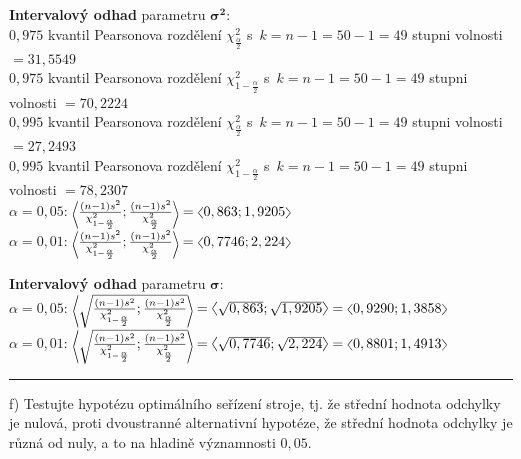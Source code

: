 \documentclass[a4paper, 11pt]{article}
\newcommand{\intlr}[1]{\scaleleftright[1ex]{<}{#1}{>}}
\begin{document}
	\vspace{1em}
	\textbf{Intervalový odhad} parametru $ \boldsymbol{\sigma^2} $: \\
	$ 0,975 $ kvantil Pearsonova rozdělení $ \chi_{\frac{\alpha}{2}}^2 $
	s~$ k = n - 1 = 50 - 1 = 49 $ stupni volnosti $ = 31,5549 $ \\
	$ 0,975 $ kvantil Pearsonova rozdělení $ \chi_{1 - \frac{\alpha}{2}}^2 $
	s~$ k = n - 1 = 50 - 1 = 49 $ stupni volnosti $ = 70,2224 $ \\
	$ 0,995 $ kvantil Pearsonova rozdělení $ \chi_{\frac{\alpha}{2}}^2 $
	s~$ k = n - 1 = 50 - 1 = 49 $ stupni volnosti $ = 27,2493 $ \\
	$ 0,995 $ kvantil Pearsonova rozdělení $ \chi_{1 - \frac{\alpha}{2}}^2 $
	s~$ k = n - 1 = 50 - 1 = 49 $ stupni volnosti $ = 78,2307 $ \\
	$ \alpha = 0,05 $: $ \intlr{\frac{(n - 1) s^2}{\chi_{1 -
	\frac{\alpha}{2}}^2}; \frac{(n - 1) s^2}{\chi_{\frac{\alpha}{2}}^2}} =
	\intlr{0,863; 1,9205} $ \\
	$ \alpha = 0,01 $: $ \intlr{\frac{(n - 1) s^2}{\chi_{1 -
	\frac{\alpha}{2}}^2}; \frac{(n - 1) s^2}{\chi_{\frac{\alpha}{2}}^2}} =
	\intlr{0,7746; 2,224} $

	\vspace{1em}
	\textbf{Intervalový odhad} parametru $ \boldsymbol{\sigma} $: \\
	$ \alpha = 0,05 $: $ \intlr{\sqrt{\frac{(n - 1) s^2}{\chi_{1 -
	\frac{\alpha}{2}}^2}; \frac{(n - 1) s^2}{\chi_{\frac{\alpha}{2}}^2}}} =
	\intlr{\sqrt{0,863}; \sqrt{1,9205}} = \intlr{0,9290; 1,3858} $ \\
	$ \alpha = 0,01 $: $ \intlr{\sqrt{\frac{(n - 1) s^2}{\chi_{1 -
	\frac{\alpha}{2}}^2}; \frac{(n - 1) s^2}{\chi_{\frac{\alpha}{2}}^2}}} =
	\intlr{\sqrt{0,7746}; \sqrt{2,224}} = \intlr{0,8801; 1,4913} $

	\vspace{1em}\noindent\rule{\textwidth}{.5pt}\vspace{1em}

	f) Testujte hypotézu optimálního seřízení stroje, tj. že střední
	hodnota odchylky je nulová, proti dvoustranné alternativní hypotéze,
	že střední hodnota odchylky je různá od nuly, a to na hladině
	významnosti $ 0,05 $.
	\vspace{1em}
\end{document}
